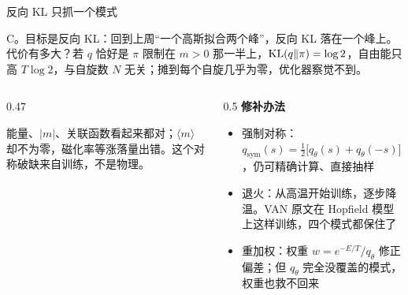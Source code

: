 \documentclass[aspectratio=169,10pt,UTF8,fontset=none]{ctexbeamer}
\begin{document}
\begin{frame}{反向 KL 只抓一个模式}
  \begin{answer}
    C。目标是反向 KL：回到上周“一个高斯拟合两个峰”，反向 KL 落在一个峰上。代价有多大？若 $q$ 恰好是 $\pi$ 限制在 $m>0$ 那一半上，$\mathrm{KL}(q\Vert\pi)=\log2$，自由能只高 $T\log2$，与自旋数 $N$ 无关；摊到每个自旋几乎为零，优化器察觉不到。
  \end{answer}
  \vspace{2mm}
  \begin{columns}[T]
    \begin{column}{0.47\textwidth}
      \begin{caution}[后果]
        能量、$|m|$、关联函数看起来都对；$\langle m\rangle$ 却不为零，磁化率等涨落量出错。这个对称破缺来自训练，不是物理。
      \end{caution}
    \end{column}
    \begin{column}{0.5\textwidth}
      \small
      \textbf{修补办法}
      \begin{itemize}
        \item 强制对称：$q_{\mathrm{sym}}(s)=\tfrac12\bigl[q_\theta(s)+q_\theta(-s)\bigr]$，仍可精确计算、直接抽样
        \item 退火：从高温开始训练，逐步降温。VAN 原文在 Hopfield 模型上这样训练，四个模式都保住了
        \item 重加权：权重 $w=e^{-E/T}/q_\theta$ 修正偏差；但 $q_\theta$ 完全没覆盖的模式，权重也救不回来
      \end{itemize}
    \end{column}
  \end{columns}
\end{frame}
\end{document}
